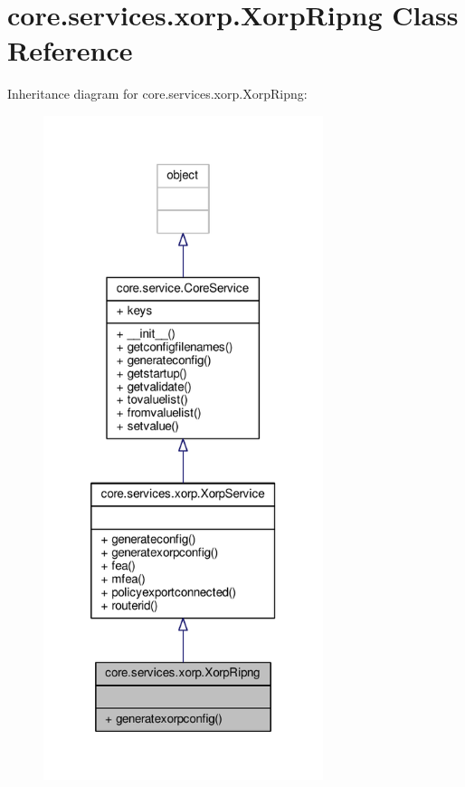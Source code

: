 \hypertarget{classcore_1_1services_1_1xorp_1_1_xorp_ripng}{\section{core.\+services.\+xorp.\+Xorp\+Ripng Class Reference}
\label{classcore_1_1services_1_1xorp_1_1_xorp_ripng}
}


Inheritance diagram for core.\+services.\+xorp.\+Xorp\+Ripng\+:
\nopagebreak
\begin{figure}[H]
\begin{center}
\leavevmode
\includegraphics[height=550pt]{classcore_1_1services_1_1xorp_1_1_xorp_ripng__inherit__graph}
\end{center}
\end{figure}


